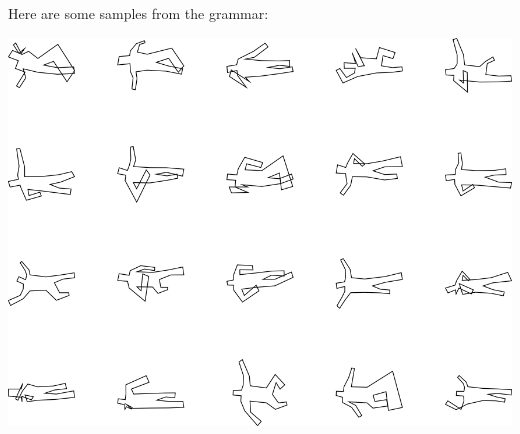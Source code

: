 Here are some samples from the grammar:

\includegraphics[width=6in]{output/3.learning/sdf_tuning/gram.9.d/samples.png}

